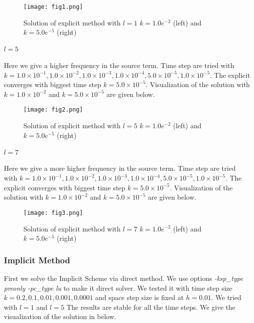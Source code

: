 \documentclass[a4paper,12pt]{article}
\begin{document}
\begin{figure}[H]
\begin{center}
\texttt{[image: fig1.png]}
\caption{Solution of explicit method with \(l=1\) \(k = 1.0e^{-2}\) (left) and \(k = 5.0e^{-5}\) (right)}
\end{center}
\end{figure}

\paragraph{\(l=5\)}
Here we give a higher frequency in the source term. Time step are tried with \(k = 1.0\times 10^{-1}, 1.0\times 10^{-2}, 1.0\times 10^{-3}, 1.0\times 10^{-4}, 5.0\times 10^{-5}, 1.0\times 10^{-5}\). The explicit converges with biggest time step \(k=5.0\times 10^{-5}\). Visualization of the solution with \(k = 1.0\times 10^{-2}\) and \(k = 5.0\times 10^{-5}\) are given below. 

\begin{figure}[H]
\begin{center}
\texttt{[image: fig2.png]}
\caption{Solution of explicit method with \(l=5\) \(k = 1.0e^{-2}\) (left) and \(k = 5.0e^{-5}\) (right)}
\end{center}
\end{figure}

\paragraph{\(l=7\)}
Here we give a more higher frequency in the source term. Time step are tried with \(k = 1.0\times 10^{-1}, 1.0\times 10^{-2}, 1.0\times 10^{-3}, 1.0\times 10^{-4}, 5.0\times 10^{-5}, 1.0\times 10^{-5}\). The explicit converges with biggest time step \(k=5.0\times 10^{-5}\). Visualization of the solution with \(k = 1.0\times 10^{-2}\) and \(k = 5.0\times 10^{-5}\) are given below. 

\begin{figure}[H]
\begin{center}
\texttt{[image: fig3.png]}
\caption{Solution of explicit method with \(l=7\) \(k = 1.0e^{-2}\) (left) and \(k = 5.0e^{-5}\) (right)}
\end{center}
\end{figure}

\subsubsection{Implicit Method}
First we solve the Implicit Scheme via direct method. We use options \textit{-ksp\_type preonly -pc\_type lu} to make it direct solver. We tested it with time step size \(k=0.2, 0.1, 0.01, 0.001, 0.0001\) and space step size is fixed at \(h = 0.01\). We tried with \(l=1\) and \(l=5	\) The results are stable for all the time steps. We give the visualization of the solution in below. \\
\end{document}

